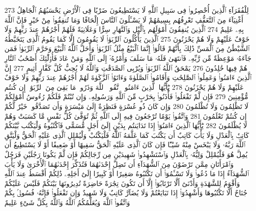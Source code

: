 {\tiny\colorbox{cl_aya}{273}} لِلْفُقَرَآءِ ٱلَّذِينَ أُحْصِرُوا۟ فِى سَبِيلِ ٱللَّهِ لَا يَسْتَطِيعُونَ ضَرْبًا فِى ٱلْأَرْضِ يَحْسَبُهُمُ ٱلْجَاهِلُ أَغْنِيَآءَ مِنَ ٱلتَّعَفُّفِ تَعْرِفُهُم بِسِيمَٰهُمْ لَا يَسْـَٔلُونَ ٱلنَّاسَ إِلْحَافًا وَمَا تُنفِقُوا۟ مِنْ خَيْرٍ فَإِنَّ ٱللَّهَ بِهِۦ عَلِيمٌ
{\tiny\colorbox{cl_aya}{274}} ٱلَّذِينَ يُنفِقُونَ أَمْوَٰلَهُم بِٱلَّيْلِ وَٱلنَّهَارِ سِرًّا وَعَلَانِيَةً فَلَهُمْ أَجْرُهُمْ عِندَ رَبِّهِمْ وَلَا خَوْفٌ عَلَيْهِمْ وَلَا هُمْ يَحْزَنُونَ
{\tiny\colorbox{cl_aya}{275}} ٱلَّذِينَ يَأْكُلُونَ ٱلرِّبَوٰا۟ لَا يَقُومُونَ إِلَّا كَمَا يَقُومُ ٱلَّذِى يَتَخَبَّطُهُ ٱلشَّيْطَٰنُ مِنَ ٱلْمَسِّ ذَٰلِكَ بِأَنَّهُمْ قَالُوٓا۟ إِنَّمَا ٱلْبَيْعُ مِثْلُ ٱلرِّبَوٰا۟ وَأَحَلَّ ٱللَّهُ ٱلْبَيْعَ وَحَرَّمَ ٱلرِّبَوٰا۟ فَمَن جَآءَهُۥ مَوْعِظَةٌ مِّن رَّبِّهِۦ فَٱنتَهَىٰ فَلَهُۥ مَا سَلَفَ وَأَمْرُهُۥٓ إِلَى ٱللَّهِ وَمَنْ عَادَ فَأُو۟لَٰٓئِكَ أَصْحَٰبُ ٱلنَّارِ هُمْ فِيهَا خَٰلِدُونَ
{\tiny\colorbox{cl_aya}{276}} يَمْحَقُ ٱللَّهُ ٱلرِّبَوٰا۟ وَيُرْبِى ٱلصَّدَقَٰتِ وَٱللَّهُ لَا يُحِبُّ كُلَّ كَفَّارٍ أَثِيمٍ
{\tiny\colorbox{cl_aya}{277}} إِنَّ ٱلَّذِينَ ءَامَنُوا۟ وَعَمِلُوا۟ ٱلصَّٰلِحَٰتِ وَأَقَامُوا۟ ٱلصَّلَوٰةَ وَءَاتَوُا۟ ٱلزَّكَوٰةَ لَهُمْ أَجْرُهُمْ عِندَ رَبِّهِمْ وَلَا خَوْفٌ عَلَيْهِمْ وَلَا هُمْ يَحْزَنُونَ
{\tiny\colorbox{cl_aya}{278}} يَٰٓأَيُّهَا ٱلَّذِينَ ءَامَنُوا۟ ٱتَّقُوا۟ ٱللَّهَ وَذَرُوا۟ مَا بَقِىَ مِنَ ٱلرِّبَوٰٓا۟ إِن كُنتُم مُّؤْمِنِينَ
{\tiny\colorbox{cl_aya}{279}} فَإِن لَّمْ تَفْعَلُوا۟ فَأْذَنُوا۟ بِحَرْبٍ مِّنَ ٱللَّهِ وَرَسُولِهِۦ وَإِن تُبْتُمْ فَلَكُمْ رُءُوسُ أَمْوَٰلِكُمْ لَا تَظْلِمُونَ وَلَا تُظْلَمُونَ
{\tiny\colorbox{cl_aya}{280}} وَإِن كَانَ ذُو عُسْرَةٍ فَنَظِرَةٌ إِلَىٰ مَيْسَرَةٍ وَأَن تَصَدَّقُوا۟ خَيْرٌ لَّكُمْ إِن كُنتُمْ تَعْلَمُونَ
{\tiny\colorbox{cl_aya}{281}} وَٱتَّقُوا۟ يَوْمًا تُرْجَعُونَ فِيهِ إِلَى ٱللَّهِ ثُمَّ تُوَفَّىٰ كُلُّ نَفْسٍ مَّا كَسَبَتْ وَهُمْ لَا يُظْلَمُونَ
{\tiny\colorbox{cl_aya}{282}} يَٰٓأَيُّهَا ٱلَّذِينَ ءَامَنُوٓا۟ إِذَا تَدَايَنتُم بِدَيْنٍ إِلَىٰٓ أَجَلٍ مُّسَمًّى فَٱكْتُبُوهُ وَلْيَكْتُب بَّيْنَكُمْ كَاتِبٌۢ بِٱلْعَدْلِ وَلَا يَأْبَ كَاتِبٌ أَن يَكْتُبَ كَمَا عَلَّمَهُ ٱللَّهُ فَلْيَكْتُبْ وَلْيُمْلِلِ ٱلَّذِى عَلَيْهِ ٱلْحَقُّ وَلْيَتَّقِ ٱللَّهَ رَبَّهُۥ وَلَا يَبْخَسْ مِنْهُ شَيْـًٔا فَإِن كَانَ ٱلَّذِى عَلَيْهِ ٱلْحَقُّ سَفِيهًا أَوْ ضَعِيفًا أَوْ لَا يَسْتَطِيعُ أَن يُمِلَّ هُوَ فَلْيُمْلِلْ وَلِيُّهُۥ بِٱلْعَدْلِ وَٱسْتَشْهِدُوا۟ شَهِيدَيْنِ مِن رِّجَالِكُمْ فَإِن لَّمْ يَكُونَا رَجُلَيْنِ فَرَجُلٌ وَٱمْرَأَتَانِ مِمَّن تَرْضَوْنَ مِنَ ٱلشُّهَدَآءِ أَن تَضِلَّ إِحْدَىٰهُمَا فَتُذَكِّرَ إِحْدَىٰهُمَا ٱلْأُخْرَىٰ وَلَا يَأْبَ ٱلشُّهَدَآءُ إِذَا مَا دُعُوا۟ وَلَا تَسْـَٔمُوٓا۟ أَن تَكْتُبُوهُ صَغِيرًا أَوْ كَبِيرًا إِلَىٰٓ أَجَلِهِۦ ذَٰلِكُمْ أَقْسَطُ عِندَ ٱللَّهِ وَأَقْوَمُ لِلشَّهَٰدَةِ وَأَدْنَىٰٓ أَلَّا تَرْتَابُوٓا۟ إِلَّآ أَن تَكُونَ تِجَٰرَةً حَاضِرَةً تُدِيرُونَهَا بَيْنَكُمْ فَلَيْسَ عَلَيْكُمْ جُنَاحٌ أَلَّا تَكْتُبُوهَا وَأَشْهِدُوٓا۟ إِذَا تَبَايَعْتُمْ وَلَا يُضَآرَّ كَاتِبٌ وَلَا شَهِيدٌ وَإِن تَفْعَلُوا۟ فَإِنَّهُۥ فُسُوقٌۢ بِكُمْ وَٱتَّقُوا۟ ٱللَّهَ وَيُعَلِّمُكُمُ ٱللَّهُ وَٱللَّهُ بِكُلِّ شَىْءٍ عَلِيمٌ
